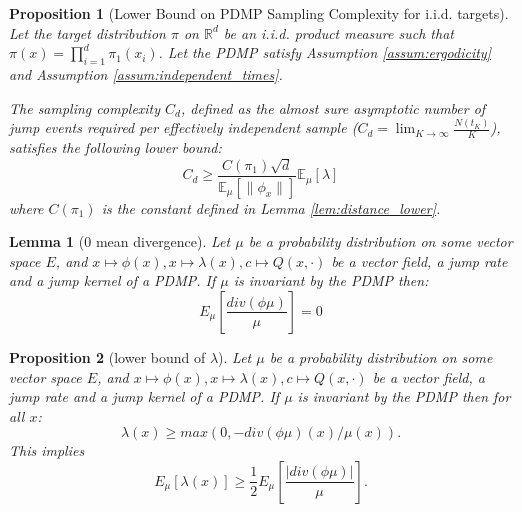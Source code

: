 \documentclass[10pt,a4paper]{amsart}
\newtheorem{proposition}{Proposition}
\newtheorem{lemma}{Lemma}
\begin{document}
\begin{proposition}[Lower Bound on PDMP Sampling Complexity for i.i.d. targets]
    \label{prop:complexity_lower_bound}
    Let the target distribution $\pi$ on $\mathbb{R}^d$ be an i.i.d. product measure such that $\pi(x) = \prod_{i=1}^d \pi_1(x_i)$. Let the PDMP satisfy Assumption \ref{assum:ergodicity} and Assumption \ref{assum:independent_times}. 
    
    The sampling complexity $C_d$, defined as the almost sure asymptotic number of jump events required per effectively independent sample ($C_d = \lim_{K \to \infty} \frac{N(t_K)}{K}$), satisfies the following lower bound:
    \[
        C_d \geq \frac{C(\pi_1)\sqrt{d}}{\mathbb{E}_\mu[\|\phi_x\|]} \mathbb{E}_\mu[\lambda]
    \]
    where $C(\pi_1)$ is the constant defined in Lemma \ref{lem:distance_lower}.
\end{proposition}

\begin{lemma}[0 mean divergence]
    \label{lemma:zero-mean-div}
    Let $\mu$ be a probability distribution on some vector space $E$, and $x\mapsto \phi(x), x \mapsto \lambda(x), c\mapsto Q(x,\cdot)$ be a vector field, a jump rate and a jump kernel of a PDMP. If $\mu$ is invariant by the PDMP then:
    \[
        E_\mu[\frac{div(\phi \mu)}{\mu}] = 0
    \]
\end{lemma}

\begin{proposition}[lower bound of $\lambda$]
    \label{prop:lower-bound}
    Let $\mu$ be a probability distribution on some vector space $E$, and $x\mapsto \phi(x), x \mapsto \lambda(x), c\mapsto Q(x,\cdot)$ be a vector field, a jump rate and a jump kernel of a PDMP. If $\mu$ is invariant by the PDMP then for all $x$:
    \[
        \lambda(x) \geq max(0, -div(\phi \mu)(x) / \mu(x)). 
    \]
    This implies
    \[
        E_\mu[\lambda(x)] \geq \frac{1}{2} E_\mu[\frac{|div(\phi \mu)|}{\mu}].
    \]
\end{proposition}
\end{document}
